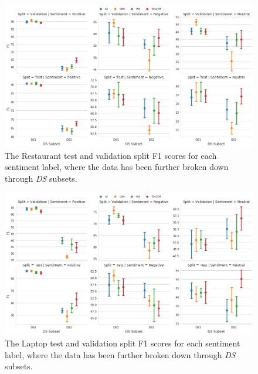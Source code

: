 \begin{figure}[h!]
    \centering
    \includegraphics[scale=0.3]{images/augmentation/methods_performance/baseline/sentiment_f1_ds_restaurant.png}
    \caption{The Restaurant test and validation split F1 scores for each sentiment label, where the data has been further broken down through \textit{DS} subsets.}
    \label{fig:aug_baseline_sentiment_f1_ds_restaurant}
\end{figure}
\begin{figure}[h!]
    \centering
    \includegraphics[scale=0.3]{images/augmentation/methods_performance/baseline/sentiment_f1_ds_laptop.png}
    \caption{The Laptop test and validation split F1 scores for each sentiment label, where the data has been further broken down through \textit{DS} subsets.}
    \label{fig:aug_baseline_sentiment_f1_ds_laptop}
\end{figure}


